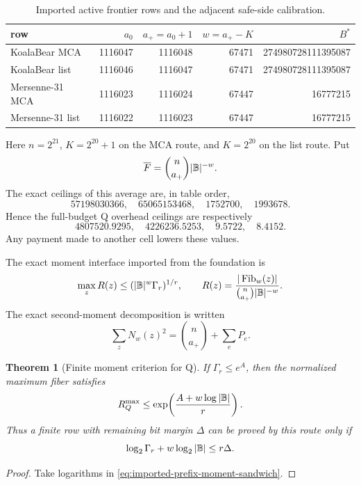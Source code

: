 \documentclass[11pt,a4paper]{amsart}
\numberwithin{equation}{section}
\newtheorem{theorem}{Theorem}[section]
\theoremstyle{remark}
\begin{document}
\begin{table}[H]
\centering
\caption{Imported active frontier rows and the adjacent safe-side calibration.}
\label{tab:active-frontier-rows}
\small
\begin{tabular}{@{}lrrrr@{}}
\toprule
row & $a_0$ & $a_+=a_0+1$ & $w=a_+-K$ & $B^*$\\
\midrule
KoalaBear MCA & 1116047 & 1116048 & 67471 & 274980728111395087\\
KoalaBear list & 1116046 & 1116047 & 67471 & 274980728111395087\\
Mersenne-31 MCA & 1116023 & 1116024 & 67447 & 16777215\\
Mersenne-31 list & 1116022 & 1116023 & 67447 & 16777215\\
\bottomrule
\end{tabular}
\end{table}
Here $n=2^{21}$, $K=2^{20}+1$ on the MCA route, and $K=2^{20}$ on the list route.  Put
\[
 \overline F=\binom n{a_+}|\mathbb B|^{-w}.
\]
The exact ceilings of this average are, in table order,
\begin{equation}
57198030366,\quad 65065153468,\quad 1752700,\quad 1993678.\label{eq:finite-average-ceilings}
\end{equation}
Hence the full-budget Q overhead ceilings are respectively
\begin{equation}
4807520.9295,\quad 4226236.5253,\quad 9.5722,\quad 8.4152.\label{eq:finite-q-ratios}
\end{equation}
Any payment made to another cell lowers these values.

The exact moment interface imported from the foundation is
\begin{equation}
 \max_z R(z)\le (|\mathbb B|^w\Gamma_r)^{1/r},
 \qquad R(z)=\frac{|\operatorname{Fib}_w(z)|}{\binom n{a_+}|\mathbb B|^{-w}}.\label{eq:imported-prefix-moment-sandwich}
\end{equation}
The exact second-moment decomposition is written
\begin{equation}
 \sum_zN_w(z)^2=\binom n{a_+}+\sum_eP_e.\label{eq:imported-second-moment}
\end{equation}

\begin{theorem}[Finite moment criterion for Q]\label{thm:moment-q}
If $\Gamma_r\le e^A$, then the normalized maximum fiber satisfies
\[
 R_Q^{\max}\le\exp\!\left(\frac{A+w\log|\mathbb B|}{r}\right).
\]
Thus a finite row with remaining bit margin $\Delta$ can be proved by this route only if
\begin{equation}
 \log_2\Gamma_r+w\log_2|\mathbb B|\le r\Delta.\label{eq:finite-moment-criterion}
\end{equation}
\end{theorem}
\begin{proof}
Take logarithms in \eqref{eq:imported-prefix-moment-sandwich}.
\end{proof}
\end{document}
